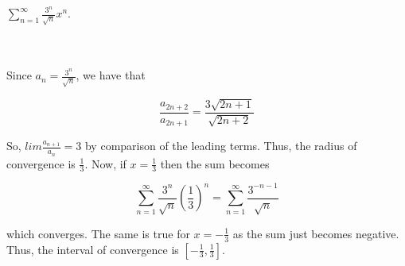 $\sum_{n=1}^{\infty} \frac{3^n}{\sqrt{n}}x^n$.\\\\

\begin{solution}\renewcommand{\qedsymbol}{}\ \\
    Since $a_n=\frac{3^n}{\sqrt{n}}$, we have that
    
    $$\frac{a_{2n+2}}{a_{2n+1}}=\frac{3\sqrt{2n+1}}{\sqrt{2n+2}}$$
    
    So, $lim \frac{a_{n+1}}{a_n}=3$ by comparison of the leading terms. Thus, the radius of convergence
    is $\frac13$. Now, if $x=\frac13$ then the sum becomes
    
    $$\sum_{n=1}^{\infty} \frac{3^n}{\sqrt{n}}(\frac13)^n=\sum_{n=1}^{\infty}\frac{3^{-n-1}}{\sqrt{n}}$$
    
    which converges. The same is true for $x=-\frac13$ as the sum just becomes negative. Thus, the
    interval of convergence is $[-\frac13,\frac13]$.

\end{solution}